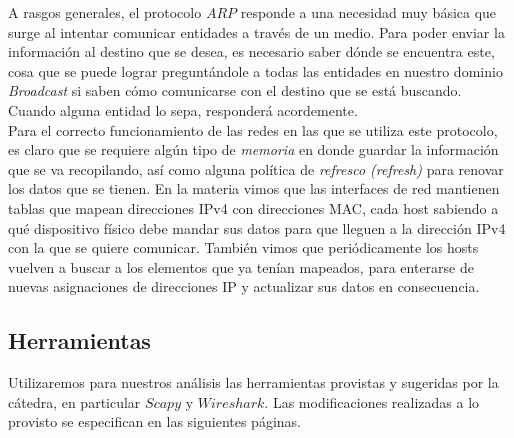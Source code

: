 A rasgos generales, el protocolo $ARP$ responde a una necesidad muy básica que surge
al intentar comunicar entidades a través de un medio. Para poder enviar la información
al destino que se desea, es necesario saber dónde se encuentra este, cosa que se puede
lograr preguntándole a todas las entidades en nuestro dominio \textit{Broadcast} si
saben cómo comunicarse con el destino que se está buscando. Cuando alguna entidad lo
sepa, responderá acordemente.\\

Para el correcto funcionamiento de las redes en las que se utiliza este protocolo, es
claro que se requiere algún tipo de \textit{memoria} en donde guardar la información
que se va recopilando, así como alguna política de \textit{refresco (refresh)} para
renovar los datos que se tienen. En la materia vimos que las interfaces de red mantienen tablas que mapean direcciones
IPv4 con direcciones MAC, cada host sabiendo a qué dispositivo físico debe mandar sus
datos para que lleguen a la dirección IPv4 con la que se quiere comunicar. También vimos
que periódicamente los hosts vuelven a buscar a los elementos que ya tenían mapeados,
para enterarse de nuevas asignaciones de direcciones IP y actualizar sus datos en
consecuencia.

\subsection{Herramientas}

Utilizaremos para nuestros análisis las herramientas provistas y sugeridas por la cátedra,
en particular $Scapy$ y $Wireshark$. Las modificaciones realizadas a lo provisto se
especifican en las siguientes páginas.